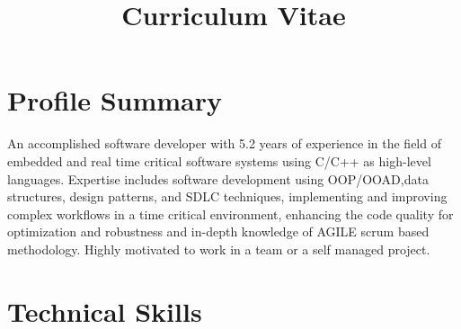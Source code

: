 \documentclass[11pt,a4paper,sans]{moderncv} %
\title{Curriculum Vitae}
\begin{document}
\makecvtitle %


\section{Profile Summary }
An accomplished software developer with 5.2 years of experience in the field of embedded and real time critical software systems using C/C++ as high-level languages.
Expertise includes software development using OOP/OOAD,data structures, design patterns, and SDLC techniques, implementing and improving complex workflows in a time critical environment, enhancing the code quality for optimization and robustness and in-depth knowledge of  AGILE scrum based methodology.
Highly motivated to work in a team or a self managed project.


\section{Technical Skills}
\end{document}
